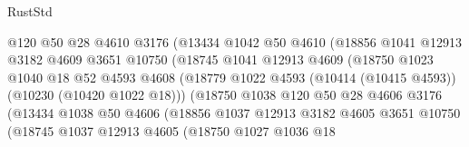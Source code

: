 \begin{lexlean}{RustStd}
\begin{coremodule}
                              @120
                              @50
                              @28
                              @4610
                              @3176
                              (@13434
                                @1042
                                @50
                                @4610
                                (@18856
                                  @1041
                                  @12913
                                  @3182
                                  @4609
                                  @3651
                                  @10750
                                  (@18745
                                    @1041
                                    @12913
                                    @4609
                                    (@18750
                                      @1023
                                      @1040
                                      @18
                                      @52
                                      @4593
                                      @4608
                                      (@18779
                                        @1022
                                        @4593
                                        (@10414 (@10415 @4593))
                                        (@10230 (@10420 @1022 @18)))
                                      (@18750
                                        @1038
                                        @120
                                        @50
                                        @28
                                        @4606
                                        @3176
                                        (@13434
                                          @1038
                                          @50
                                          @4606
                                          (@18856
                                            @1037
                                            @12913
                                            @3182
                                            @4605
                                            @3651
                                            @10750
                                            (@18745
                                              @1037
                                              @12913
                                              @4605
                                              (@18750
                                                @1027
                                                @1036
                                                @18

\end{coremodule}
\end{lexlean}
